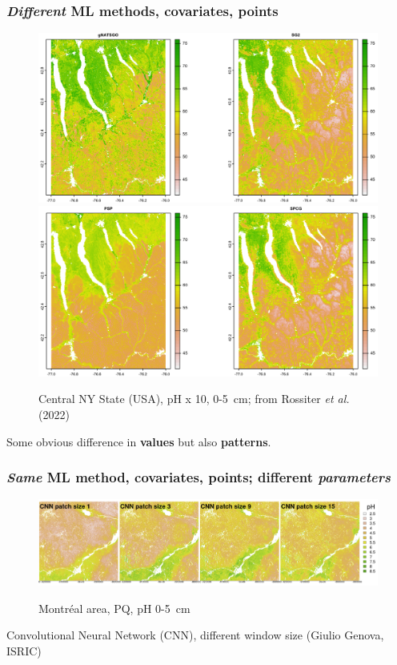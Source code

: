\documentclass[aspectratio=169, 10pt]{beamer}
\begin{document}
\begin{frame}
  \frametitle{\emph{Different} ML methods, covariates,  points}
    \begin{figure}
        \includegraphics[width=0.49\linewidth]{./graphics_david/Fig07a.png}
        \includegraphics[width=0.49\linewidth]{./graphics_david/Fig07b.png}
\par        
    Central NY State (USA), pH x 10, 0-5~cm; from Rossiter \emph{et al.} (2022)
    \end{figure}
 Some obvious difference in \textbf{values} but also \textbf{patterns}.
\end{frame}

\begin{frame}
  \frametitle{\emph{Same} ML method, covariates, points; different
    \emph{parameters}}
    \begin{figure}
        \centering
        \includegraphics[width=\textwidth]{./graphics_david/GenovaPosterFig1a.png}
        \par Montr\'{e}al area, PQ, pH 0-5~cm
    \end{figure}
{Convolutional Neural Network (CNN), different window size (Giulio Genova, ISRIC)}
\end{frame}
\end{document}
